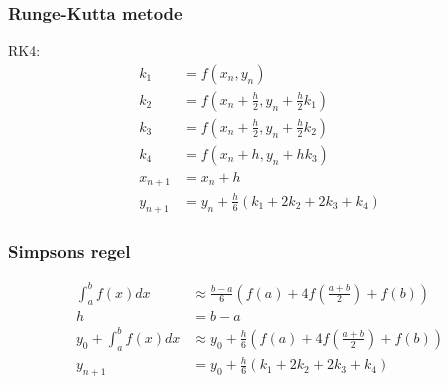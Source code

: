 \begin{frame}
\frametitle{Runge-Kutta metode}
RK4:\\
\begin{align*}
k_1&=f(x_n,y_n)\\
k_2&=f(x_n+\frac{h}{2},y_n+\frac{h}{2}k_1)\\
k_3&=f(x_n+\frac{h}{2},y_n+\frac{h}{2}k_2)\\
k_4&=f(x_n+h,y_n+h k_3)\\
x_{n+1}&=x_n+h\\
y_{n+1}&=y_n+\frac{h}{6}(k_1+2k_2+2k_3+k_4)
\end{align*}
\end{frame}

\begin{frame}
\frametitle{Simpsons regel}
\begin{align*}
\int_a^bf(x)dx &\approx \frac{b-a}{6} \left( f(a)+4f \left( \frac{a+b}{2} \right)+f(b) \right)\\
h&=b-a\\
y_0+\int_a^bf(x)dx &\approx y_0+ \frac{h}{6} \left( f(a)+4f \left( \frac{a+b}{2} \right)+f(b) \right)\\
y_{n+1}&=y_0+\frac{h}{6}(k_1+2k_2+2k_3+k_4)
\end{align*}
\end{frame}

